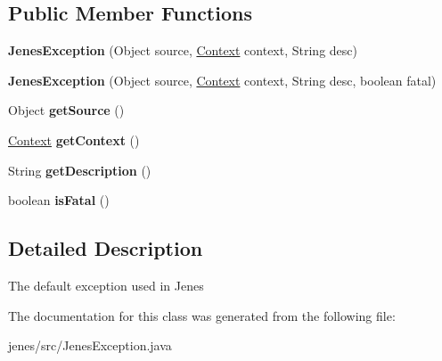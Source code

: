 \subsection*{Public Member Functions}
\begin{DoxyCompactItemize}
\item 
\hypertarget{classjenes_1_1_jenes_exception_a0896ada42c15de11ae090d00f60712e6}{{\bfseries Jenes\-Exception} (Object source, \hyperlink{enumjenes_1_1_jenes_exception_1_1_context}{Context} context, String desc)}\label{classjenes_1_1_jenes_exception_a0896ada42c15de11ae090d00f60712e6}

\item 
\hypertarget{classjenes_1_1_jenes_exception_ab12d2e209aa3cfe14f08b4732271d9d9}{{\bfseries Jenes\-Exception} (Object source, \hyperlink{enumjenes_1_1_jenes_exception_1_1_context}{Context} context, String desc, boolean fatal)}\label{classjenes_1_1_jenes_exception_ab12d2e209aa3cfe14f08b4732271d9d9}

\item 
\hypertarget{classjenes_1_1_jenes_exception_a1dc5c4b0404aeab984604002fad7dbfb}{Object {\bfseries get\-Source} ()}\label{classjenes_1_1_jenes_exception_a1dc5c4b0404aeab984604002fad7dbfb}

\item 
\hypertarget{classjenes_1_1_jenes_exception_a9a47a0e830dda47c1f9841461fb29726}{\hyperlink{enumjenes_1_1_jenes_exception_1_1_context}{Context} {\bfseries get\-Context} ()}\label{classjenes_1_1_jenes_exception_a9a47a0e830dda47c1f9841461fb29726}

\item 
\hypertarget{classjenes_1_1_jenes_exception_a0d37f5de0bddb6c1a3014816f217281c}{String {\bfseries get\-Description} ()}\label{classjenes_1_1_jenes_exception_a0d37f5de0bddb6c1a3014816f217281c}

\item 
\hypertarget{classjenes_1_1_jenes_exception_a4d673283c5e13dd3b95e73cf780e9419}{boolean {\bfseries is\-Fatal} ()}\label{classjenes_1_1_jenes_exception_a4d673283c5e13dd3b95e73cf780e9419}

\end{DoxyCompactItemize}


\subsection{Detailed Description}
The default exception used in Jenes 

The documentation for this class was generated from the following file\-:\begin{DoxyCompactItemize}
\item 
jenes/src/Jenes\-Exception.\-java\end{DoxyCompactItemize}
